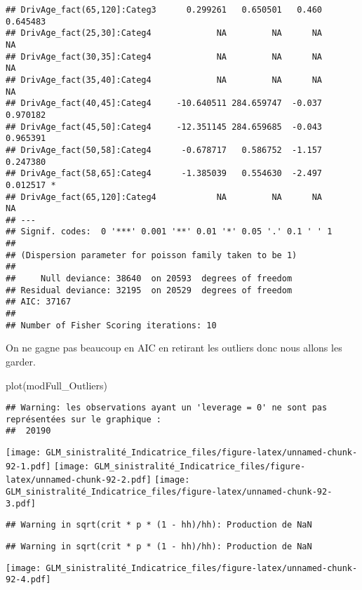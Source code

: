 \documentclass[
]{article}
\newenvironment{Shaded}{\begin{snugshade}}{\end{snugshade}}
\newcommand{\FunctionTok}[1]{\textcolor[rgb]{0.00,0.00,0.00}{#1}}
\newcommand{\NormalTok}[1]{#1}
\begin{document}
\begin{verbatim}
## DrivAge_fact(65,120]:Categ3      0.299261   0.650501   0.460 0.645483    
## DrivAge_fact(25,30]:Categ4             NA         NA      NA       NA    
## DrivAge_fact(30,35]:Categ4             NA         NA      NA       NA    
## DrivAge_fact(35,40]:Categ4             NA         NA      NA       NA    
## DrivAge_fact(40,45]:Categ4     -10.640511 284.659747  -0.037 0.970182    
## DrivAge_fact(45,50]:Categ4     -12.351145 284.659685  -0.043 0.965391    
## DrivAge_fact(50,58]:Categ4      -0.678717   0.586752  -1.157 0.247380    
## DrivAge_fact(58,65]:Categ4      -1.385039   0.554630  -2.497 0.012517 *  
## DrivAge_fact(65,120]:Categ4            NA         NA      NA       NA    
## ---
## Signif. codes:  0 '***' 0.001 '**' 0.01 '*' 0.05 '.' 0.1 ' ' 1
## 
## (Dispersion parameter for poisson family taken to be 1)
## 
##     Null deviance: 38640  on 20593  degrees of freedom
## Residual deviance: 32195  on 20529  degrees of freedom
## AIC: 37167
## 
## Number of Fisher Scoring iterations: 10
\end{verbatim}

On ne gagne pas beaucoup en AIC en retirant les outliers donc nous
allons les garder.

\begin{Shaded}
\begin{Highlighting}[]
\FunctionTok{plot}\NormalTok{(modFull\_Outliers)}
\end{Highlighting}
\end{Shaded}

\begin{verbatim}
## Warning: les observations ayant un 'leverage = 0' ne sont pas représentées sur le graphique : 
##  20190
\end{verbatim}

\texttt{[image: GLM\_sinistralité\_Indicatrice\_files/figure-latex/unnamed-chunk-92-1.pdf]}
\texttt{[image: GLM\_sinistralité\_Indicatrice\_files/figure-latex/unnamed-chunk-92-2.pdf]}
\texttt{[image: GLM\_sinistralité\_Indicatrice\_files/figure-latex/unnamed-chunk-92-3.pdf]}

\begin{verbatim}
## Warning in sqrt(crit * p * (1 - hh)/hh): Production de NaN
\end{verbatim}

\begin{verbatim}
## Warning in sqrt(crit * p * (1 - hh)/hh): Production de NaN
\end{verbatim}

\texttt{[image: GLM\_sinistralité\_Indicatrice\_files/figure-latex/unnamed-chunk-92-4.pdf]}
\end{document}
